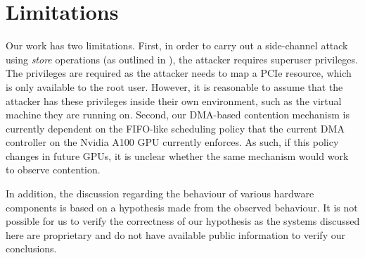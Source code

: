 \section{Limitations}
\label{sec:interconnect-sc-limitations}

Our work has two limitations.
First, in order to carry out a side-channel attack using \textit{store} operations (as outlined in ), the attacker requires superuser privileges.
The privileges are required as the attacker needs to map a PCIe resource, which is only available to the root user.
However, it is reasonable to assume that the attacker has these privileges inside their own environment, such as the virtual machine they are running on.
Second, our DMA-based contention mechanism is currently dependent on the FIFO-like scheduling policy that the current DMA controller on the Nvidia A100 GPU currently enforces.
As such, if this policy changes in future GPUs, it is unclear whether the same mechanism would work to observe contention.

In addition, the discussion regarding the behaviour of various hardware components is based on a hypothesis made from the observed behaviour.
It is not possible for us to verify the correctness of our hypothesis as the systems discussed here are proprietary and do not have available public information to verify our conclusions.
